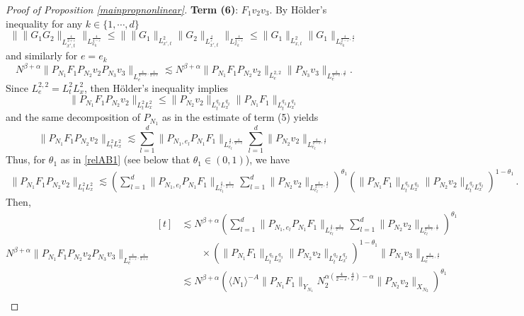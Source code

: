 \documentclass[aihp]{imsart}
\numberwithin{equation}{section}
\theoremstyle{plain}
\theoremstyle{remark}
\begin{document}
\begin{proof}[Proof of Proposition \ref{mainpropnonlinear}]
\textbf{Term (6)}: $F_1 v_2 v_3$.
By H\"older's inequality for any $k \in \{1, \cdots, d\}$
$$
\|\|G_1 G_2\|_{L^{\frac{4}{2+\varepsilon}}_{x',t}}\|_{L^{\frac{4}{4-\varepsilon}}_{x_k}} \leq \| \|G_1\|_{L^2_{x',t}} \|G_2\|_{L^{\frac{4}{\varepsilon}}_{x',t}} \|_{L^{\frac{4}{4-\varepsilon}}_{x_k}}
\leq \|G_1\|_{L^2_{x, t}} \|G_1\|_{L^{\frac{4}{2-\varepsilon} ,\frac{4}{\varepsilon}}_{e_k}}
$$
and similarly for $e = e_k$
$$N^{\beta +\alpha} \|P_{N_1}F_1 P_{N_2} v_2 P_{N_3} v_3\|_{L^{\frac{4}{4-\varepsilon} ,\frac{4}{2+\varepsilon}}_e} \lesssim  
N^{\beta +\alpha} \|P_{N_1}F_1 P_{N_2} v_2\|_{L^{2,2}_e}  \|P_{N_3} v_3\|_{L^{\frac{4}{2-\varepsilon} ,\frac{4}{\varepsilon}}_e}. $$
Since $L_e^{2,2}=L_t^2 L_x^2$, then H\"older's inequality  implies
$$
 \|P_{N_1}F_1 P_{N_2} v_2\|_{L_t^2 L_x^2} \leq  \|P_{N_2} v_2\|_{L_t^{q_2} L_x^{q_2}} \|P_{N_1}F_1 \|_{L_t^{q_3} L_x^{q_3}}
$$
and the same decomposition of $P_{N_1}$ as in the estimate of term (5) yields
$$
 \|P_{N_1}F_1 P_{N_2} v_2\|_{L_t^2 L_x^2} \lesssim \sum_{l=1}^d \|P_{N_1 ,e_l}P_{N_1} F_1\|_{L_{e_l}^{\frac{4}{\varepsilon} ,\frac{4}{2-\varepsilon}}}  \sum_{l=1}^d\|P_{N_2}v_2\|_{L_{e_l}^{\frac{4}{2-\varepsilon} ,\frac{4}{\varepsilon}}}
$$
Thus, for $\theta_1$ as in  \eqref{relAB1} (see below that $\theta_1 \in (0, 1)$), we have 
\begin{align*}
 \|P_{N_1}F_1 P_{N_2} v_2\|_{L_t^2 L_x^2} \lesssim 
 \left(\sum_{l=1}^d \|P_{N_1 ,e_l}P_{N_1} F_1\|_{L_{e_l}^{\frac{4}{\varepsilon} ,\frac{4}{2-\varepsilon}}}  \sum_{l=1}^d\|P_{N_2}v_2\|_{L_{e_l}^{\frac{4}{2-\varepsilon} ,\frac{4}{\varepsilon}}} \right)^{\theta_1} \!\!\!
 \left( \|P_{N_1}F_1 \|_{L_t^{q_3} L_x^{q_3}} \|P_{N_2} v_2\|_{L_t^{q_2} L_x^{q_2}} \right)^{1-\theta_1} \,.
\end{align*}
Then, 
\begin{equation*}
N^{\beta +\alpha}  \|P_{N_1}F_1 P_{N_2} v_2 P_{N_3} v_3\|_{L^{\frac{4}{4-\varepsilon} ,\frac{4}{2+\varepsilon}}_e} 
\begin{aligned}[t]
&\lesssim N^{\beta +\alpha}  \left
(\sum_{l=1}^d \|P_{N_1 ,e_l}P_{N_1} F_1\|_{L_{e_l}^{\frac{4}{\varepsilon} ,\frac{4}{2-\varepsilon}}}  \sum_{l=1}^d\|P_{N_2}v_2\|_{L_{e_l}^{\frac{4}{2-\varepsilon} ,\frac{4}{\varepsilon}}} \right)^{\theta_1} \\
&\qquad \times ( \| P_{N_1} F_1 \|_{L_t^{q_3} L_x^{q_3}} \|P_{N_2} v_2\|_{L_t^{q_2} L_x^{q_2}})^{1-\theta_1}  \|P_{N_3} v_3\|_{L^{\frac{4}{2-\varepsilon} ,\frac{4}{\varepsilon}}_e}\\
&\lesssim  N^{\beta +\alpha} (\langle N_1\rangle^{-A} \|P_{N_1} F_1\|_{Y_{N_1}} N_2^{ \alpha (\frac{4}{2-\varepsilon} ,\frac{4}{\varepsilon}) - \alpha } \|P_{N_2}v_2\|_{X_{N_2}} )^{\theta_1} \\

\end{aligned}
\end{equation*}
\end{proof}
\end{document}
